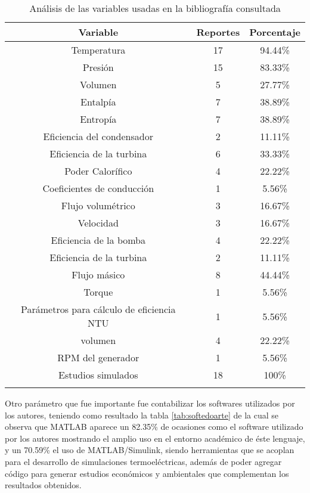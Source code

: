 \begin{table}[H]
    \centering
    \caption{Análisis de las variables usadas en la bibliografía consultada}
    \begin{tabular}{ccc}
        \hline
        Variable & Reportes & Porcentaje \\ 
        \hline
        Temperatura & 	17 & 	94.44\% \\
        Presión & 	15 & 	83.33\% \\
        Volumen & 	5 & 	27.77\% \\ 
        Entalpía & 	7 & 	38.89\% \\ 
        Entropía & 	7 & 	38.89\% \\ 
        Eficiencia del condensador & 	2 & 	11.11\% \\ 
        Eficiencia de la turbina & 	6 & 	33.33\% \\ 
        Poder Calorífico & 	4 & 	22.22\% \\ 
        Coeficientes de conducción & 	1 & 	5.56\% \\ 
        Flujo volumétrico & 	3 & 	16.67\% \\ 
        Velocidad & 	3 & 	16.67\% \\ 
        Eficiencia de la bomba & 	4 & 	22.22\% \\ 
        Eficiencia de la turbina & 	2 & 	11.11\% \\ 
        Flujo másico & 	8 & 	44.44\% \\ 
        Torque  & 	1 & 	5.56\% \\ 
        Parámetros para cálculo de eficiencia NTU & 	1 & 	5.56\% \\ 
        volumen & 	4 & 	22.22\% \\ 
        RPM del generador & 	1 & 	5.56\% \\ 
        Estudios simulados & 	18 & 	100\% \\ 
        \hline

    \label{tab:varedoarte} 
    \end{tabular}
\end{table}

\vspace{12pt}
Otro parámetro que fue importante fue contabilizar los softwares utilizados por los autores, teniendo como resultado la tabla \ref{tab:softedoarte} de la cual se observa que MATLAB aparece un 82.35\% de ocasiones como el software utilizado por los autores mostrando el amplio uso en el entorno académico de éste lenguaje, y un 70.59\% el uso de MATLAB/Simulink, siendo herramientas que se acoplan para el desarrollo de simulaciones termoeléctricas, además de poder agregar código para generar estudios económicos y ambientales que complementan los resultados obtenidos.

